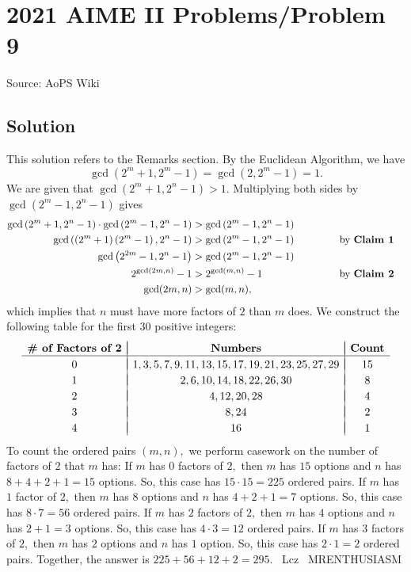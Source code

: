 \documentclass[12pt]{article}
\begin{document}
\section*{{2021 AIME II Problems/Problem 9}}
Source: AoPS Wiki

\subsection*{Solution}
This solution refers to the Remarks section. By the Euclidean Algorithm, we have \[\gcd\left(2^m+1,2^m-1\right)=\gcd\left(2,2^m-1\right)=1.\] We are given that $\gcd\left(2^m+1,2^n-1\right)>1.$ Multiplying both sides by $\gcd\left(2^m-1,2^n-1\right)$ gives \begin{align*} \gcd\left(2^m+1,2^n-1\right)\cdot\gcd\left(2^m-1,2^n-1\right)&>\gcd\left(2^m-1,2^n-1\right) \\ \gcd\left(\left(2^m+1\right)\left(2^m-1\right),2^n-1\right)&>\gcd\left(2^m-1,2^n-1\right) \hspace{12mm} &&\text{by }\textbf{Claim 1} \\ \gcd\left(2^{2m}-1,2^n-1\right)&>\gcd\left(2^m-1,2^n-1\right) \\ 2^{\gcd(2m,n)}-1&>2^{\gcd(m,n)}-1 &&\text{by }\textbf{Claim 2} \\ \gcd(2m,n)&>\gcd(m,n), \end{align*} which implies that $n$ must have more factors of $2$ than $m$ does. We construct the following table for the first $30$ positive integers: \[\begin{array}{c|c|c} && \\ [-2.5ex] \boldsymbol{\#}\textbf{ of Factors of }\boldsymbol{2} & \textbf{Numbers} & \textbf{Count} \\ \hline && \\ [-2.25ex] 0 & 1,3,5,7,9,11,13,15,17,19,21,23,25,27,29 & 15 \\ && \\ [-2.25ex] 1 & 2,6,10,14,18,22,26,30 & 8 \\ && \\ [-2.25ex] 2 & 4,12,20,28 & 4 \\ && \\ [-2.25ex] 3 & 8,24 & 2 \\ && \\ [-2.25ex] 4 & 16 & 1 \\ \end{array}\] To count the ordered pairs $(m,n),$ we perform casework on the number of factors of $2$ that $m$ has: If $m$ has $0$ factors of $2,$ then $m$ has $15$ options and $n$ has $8+4+2+1=15$ options. So, this case has $15\cdot15=225$ ordered pairs. If $m$ has $1$ factor of $2,$ then $m$ has $8$ options and $n$ has $4+2+1=7$ options. So, this case has $8\cdot7=56$ ordered pairs. If $m$ has $2$ factors of $2,$ then $m$ has $4$ options and $n$ has $2+1=3$ options. So, this case has $4\cdot3=12$ ordered pairs. If $m$ has $3$ factors of $2,$ then $m$ has $2$ options and $n$ has $1$ option. So, this case has $2\cdot1=2$ ordered pairs. Together, the answer is $225+56+12+2=\boxed{295}.$ ~Lcz ~MRENTHUSIASM
\end{document}
